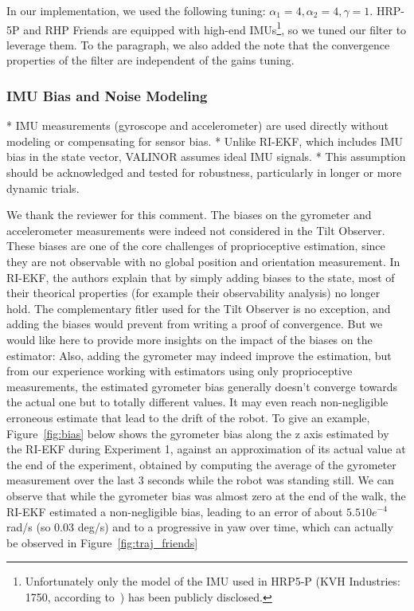 In our implementation, we used the following tuning: $\alpha_{1} = 4, \alpha_{2} = 4, \gamma = 1$. HRP-5P and RHP Friends are equipped with high-end IMUs\footnote{Unfortunately only the model of the IMU used in HRP5-P (KVH Industries: 1750, according to~\cite{Kaneko2019Hrp5}) has been publicly disclosed.}, so we tuned our filter to leverage them. 
To the paragraph, we also added the note that the convergence properties of the filter are independent of the gains tuning.

\subsubsection{IMU Bias and Noise Modeling}

\begin{revquote}
* IMU measurements (gyroscope and accelerometer) are used directly without modeling or compensating for sensor bias.
* Unlike RI-EKF, which includes IMU bias in the state vector, VALINOR assumes ideal IMU signals.
* This assumption should be acknowledged and tested for robustness, particularly in longer or more dynamic trials.
\end{revquote}

We thank the reviewer for this comment. The biases on the gyrometer and accelerometer measurements were indeed not considered in the Tilt Observer. These biases are one of the core challenges of proprioceptive estimation, since they are not observable with no global position and orientation measurement. In RI-EKF, the authors explain that by simply adding biases to the state, most of their theorical properties (for example their observability analysis) no longer hold. The complementary fitler used for the Tilt Observer is no exception, and adding the biases would prevent from writing a proof of convergence.
\alert{
But we would like here to provide more insights on the impact of the biases on the estimator:}
Also, adding the gyrometer may indeed improve the estimation, but from our experience working with estimators using only proprioceptive measurements, the estimated gyrometer bias generally doesn't converge towards the actual one but to totally different values. It may even reach non-negligible erroneous estimate that lead to the drift of the robot. To give an example, Figure~\ref{fig:bias} below shows the gyrometer bias along the z axis estimated by the RI-EKF during Experiment 1, against an approximation of its actual value at the end of the experiment, obtained by computing the average of the gyrometer measurement over the last 3 seconds while the robot was standing still. We can observe that while the gyrometer bias was almost zero at the end of the walk, the RI-EKF estimated a non-negligible bias, leading to an error of about $5.5 10e^{-4}$ rad/s (so 0.03 deg/s) and to a progressive in yaw over time, which can actually be observed in Figure~\ref{fig:traj_friends}


